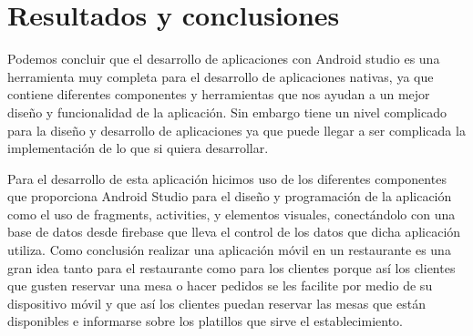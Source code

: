 \chapter{Resultados y conclusiones}


Podemos concluir que el desarrollo de aplicaciones con Android studio es una herramienta muy completa para el desarrollo de aplicaciones nativas, ya que contiene diferentes componentes y herramientas que nos ayudan a un mejor diseño y funcionalidad de la aplicación. Sin embargo  tiene un nivel complicado para la diseño y desarrollo de aplicaciones ya que puede llegar a ser complicada la implementación de lo que si quiera desarrollar.

Para el desarrollo de esta aplicación hicimos uso de los diferentes componentes que proporciona Android Studio para el diseño y programación de la aplicación como el uso de fragments, activities, y elementos visuales, conectándolo con una base de datos desde firebase que lleva el control de los datos que dicha aplicación utiliza.
Como conclusión realizar una aplicación móvil en un restaurante es una gran idea tanto para el restaurante como para los clientes porque así los clientes que gusten reservar una mesa o hacer pedidos se les facilite por medio de su dispositivo móvil y que así los clientes puedan reservar las mesas que están disponibles e informarse sobre los platillos que sirve el establecimiento.